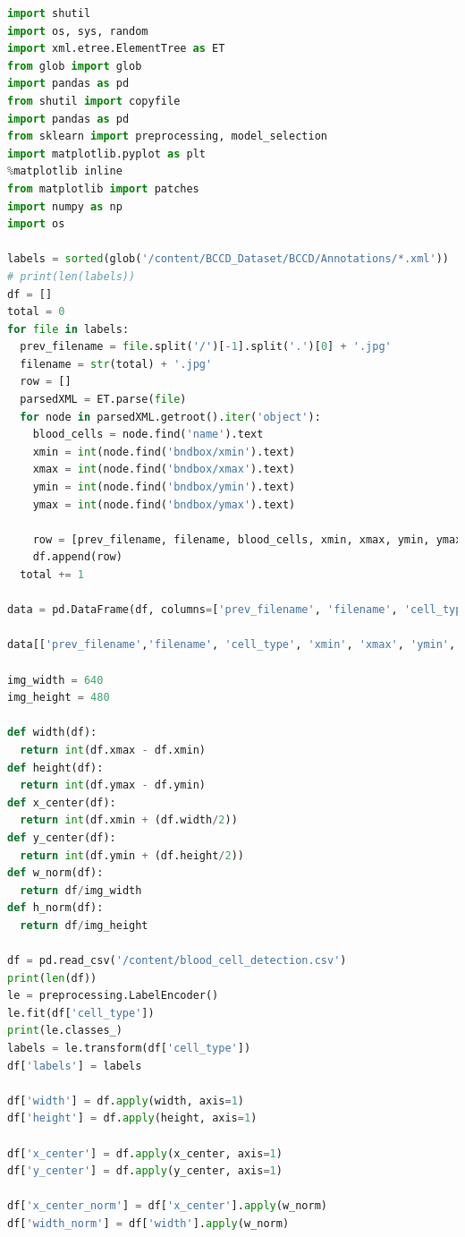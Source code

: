 \begin{lstlisting}[language=Python, caption={Code snippet in \LaTeX ~and  this is a Python code }, label=list:python_code_ex]
import shutil
import os, sys, random
import xml.etree.ElementTree as ET
from glob import glob
import pandas as pd
from shutil import copyfile
import pandas as pd
from sklearn import preprocessing, model_selection
import matplotlib.pyplot as plt
%matplotlib inline
from matplotlib import patches
import numpy as np
import os

labels = sorted(glob('/content/BCCD_Dataset/BCCD/Annotations/*.xml'))
# print(len(labels))
df = []
total = 0
for file in labels:
  prev_filename = file.split('/')[-1].split('.')[0] + '.jpg'
  filename = str(total) + '.jpg'
  row = []
  parsedXML = ET.parse(file)
  for node in parsedXML.getroot().iter('object'):
    blood_cells = node.find('name').text
    xmin = int(node.find('bndbox/xmin').text)
    xmax = int(node.find('bndbox/xmax').text)
    ymin = int(node.find('bndbox/ymin').text)
    ymax = int(node.find('bndbox/ymax').text)

    row = [prev_filename, filename, blood_cells, xmin, xmax, ymin, ymax]
    df.append(row)
  total += 1

data = pd.DataFrame(df, columns=['prev_filename', 'filename', 'cell_type', 'xmin', 'xmax', 'ymin', 'ymax'])

data[['prev_filename','filename', 'cell_type', 'xmin', 'xmax', 'ymin', 'ymax']].to_csv('/content/blood_cell_detection.csv', index=False)

img_width = 640
img_height = 480

def width(df):
  return int(df.xmax - df.xmin)
def height(df):
  return int(df.ymax - df.ymin)
def x_center(df):
  return int(df.xmin + (df.width/2))
def y_center(df):
  return int(df.ymin + (df.height/2))
def w_norm(df):
  return df/img_width
def h_norm(df):
  return df/img_height

df = pd.read_csv('/content/blood_cell_detection.csv')
print(len(df))
le = preprocessing.LabelEncoder()
le.fit(df['cell_type'])
print(le.classes_)
labels = le.transform(df['cell_type'])
df['labels'] = labels

df['width'] = df.apply(width, axis=1)
df['height'] = df.apply(height, axis=1)

df['x_center'] = df.apply(x_center, axis=1)
df['y_center'] = df.apply(y_center, axis=1)

df['x_center_norm'] = df['x_center'].apply(w_norm)
df['width_norm'] = df['width'].apply(w_norm)


\end{lstlisting}
